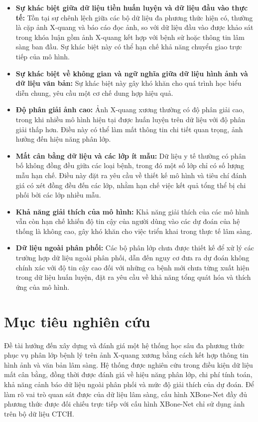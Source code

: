 \begin{itemize}
    \item \textbf{Sự khác biệt giữa dữ liệu tiền huấn luyện và dữ liệu đầu vào thực tế:} Tồn tại sự chênh lệch giữa các bộ dữ liệu đa phương thức hiện có, thường là cặp ảnh X-quang và báo cáo đọc ảnh, so với dữ liệu đầu vào được khảo sát trong khóa luận gồm ảnh X-quang kết hợp với bệnh sử hoặc thông tin lâm sàng ban đầu. Sự khác biệt này có thể hạn chế khả năng chuyển giao trực tiếp của mô hình.
    \item \textbf{Sự khác biệt về không gian và ngữ nghĩa giữa dữ liệu hình ảnh và dữ liệu văn bản:} Sự khác biệt này gây khó khăn cho quá trình học biểu diễn chung, yêu cầu một cơ chế dung hợp hiệu quả.
    \item \textbf{Độ phân giải ảnh cao:} Ảnh X-quang xương thường có độ phân giải cao, trong khi nhiều mô hình hiện tại được huấn luyện trên dữ liệu với độ phân giải thấp hơn. Điều này có thể làm mất thông tin chi tiết quan trọng, ảnh hưởng đến hiệu năng phân lớp.
    \item \textbf{Mất cân bằng dữ liệu và các lớp ít mẫu:} Dữ liệu y tế thường có phân bố không đồng đều giữa các loại bệnh, trong đó một số lớp chỉ có số lượng mẫu hạn chế. Điều này đặt ra yêu cầu về thiết kế mô hình và tiêu chí đánh giá có xét đồng đều đến các lớp, nhằm hạn chế việc kết quả tổng thể bị chi phối bởi các lớp nhiều mẫu.
    \item \textbf{Khả năng giải thích của mô hình:} Khả năng giải thích của các mô hình vẫn còn hạn chế khiến độ tin cậy của người dùng vào các dự đoán của hệ thống là không cao, gây khó khăn cho việc triển khai trong thực tế lâm sàng.    
    \item \textbf{Dữ liệu ngoài phân phối:} Các bộ phân lớp chưa được thiết kế để xử lý các trường hợp dữ liệu ngoài phân phối, dẫn đến nguy cơ đưa ra dự đoán không chính xác với độ tin cậy cao đối với những ca bệnh mới chưa từng xuất hiện trong dữ liệu huấn luyện, đặt ra yêu cầu về khả năng tổng quát hóa và thích ứng của mô hình.


\end{itemize}

\section{Mục tiêu nghiên cứu}

Đề tài hướng đến xây dựng và đánh giá một hệ thống học sâu đa phương thức phục vụ phân lớp bệnh lý trên ảnh X-quang xương bằng cách kết hợp thông tin hình ảnh và văn bản lâm sàng. Hệ thống được nghiên cứu trong điều kiện dữ liệu mất cân bằng, đồng thời được đánh giá về hiệu năng phân lớp, chi phí tính toán, khả năng cảnh báo dữ liệu ngoài phân phối và mức độ giải thích của dự đoán. Để làm rõ vai trò quan sát được của dữ liệu lâm sàng, cấu hình XBone-Net đầy đủ phương thức được đối chiếu trực tiếp với cấu hình XBone-Net chỉ sử dụng ảnh trên bộ dữ liệu CTCH.


